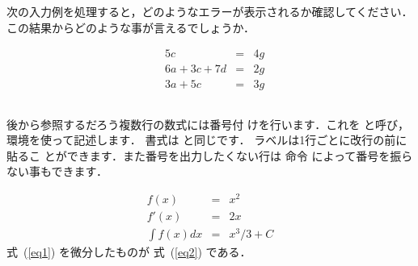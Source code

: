 \begin{Prob}


\end{Prob}

\begin{Prob}
次の入力例を処理すると，どのようなエラーが表示されるか確認してください．
この結果からどのような事が言えるでしょうか．

\begin{InTeX}
\begin{eqnarray*}
 & 5c           & = & 4g \\
 & 6a + 3c + 7d & = & 2g \\
 & 3a + 5c      & = & 3g
\end{eqnarray*}
\end{InTeX}

\end{Prob}

\subsection{}
%
%
後から参照するだろう複数行の数式には番号付
けを行います．これを{}
と呼び，環境を使って記述します．
書式は と同じです．
ラベルは1行ごとに改行\qu{\texttt{\bs\bs}}の前に貼るこ
とができます．また番号を出力したくない行は 命令
によって番号を振らない事もできます．
\begin{InOut}
\begin{eqnarray}
f(x)       &=& x^2 \label{eq1}\\
f'(x)      &=& 2x  \label{eq2}\\
\int f(x)dx&=& x^3/3+C\nonumber
\end{eqnarray}
式~(\ref{eq1}) を微分したものが
式~(\ref{eq2}) である．
\end{InOut}
 
